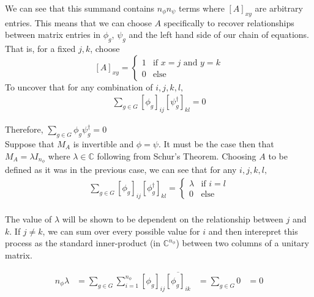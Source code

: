 \documentclass[10pt]{ucthesis}
\newcommand{\C}{\mathbb{C}}
\begin{document}
We can see that this summand contains $n_\phi n_\psi$ terms where $[A]_{xy}$ are arbitrary entries. This means that we can choose $A$ specifically to recover relationships between matrix entries in $\phi_g$, $\psi_g$ and the left hand side of our chain of equations. That is, for a fixed $j,k$, choose $$[A]_{xy} = \begin{cases}
												1 & \text{if }x=j\text{ and } y=k \\
												0 & \text{else}
\end{cases}$$
To uncover that for any combination of $i,j,k,l,$
\begin{equation}
	\begin{aligned}
		\sum_{g\in G} \left[\phi_g\right]_{ij}\left[\psi^\dag_g\right]_{kl} = 0
	\end{aligned}
\end{equation}

Therefore, $\sum_{g\in G}\phi_{g}\psi_g^{\dag}=0$ \\

Suppose that $M_A$ is invertible and $\phi=\psi$. It must be the case then that $M_A = \lambda I_{n_\phi}$ where $\lambda \in \C$ following from Schur's Theorem. Choosing $A$ to be defined as it was in the previous case, we can see that for any $i,j,k,l,$
\begin{equation}
	\begin{aligned}
		\sum_{g\in G} \left[\phi_g\right]_{ij}\left[\phi^\dag_g\right]_{kl} = \begin{cases}
																			\lambda &\text{if } i = l\\
																			0 & \text{else}
																			\end{cases}\\
	\end{aligned}
\end{equation}

The value of $\lambda$ will be shown to be dependent on the relationship between $j$ and $k$. If $j\neq k$, we can sum over every possible value for $i$ and then interepret this process as the standard inner-product (in $\C^{n_\phi}$) between two columns of a unitary matrix.

\begin{equation}
	\begin{aligned}
		n_\phi \lambda &= \sum_{g\in G} \sum_{i=1}^{n_\phi}\left[\phi_g\right]_{ij}\overline{\left[\phi_g\right]_{ik}} &= \sum_{g\in G} 0 &= 0
	\end{aligned}
\end{equation}
\end{document}
